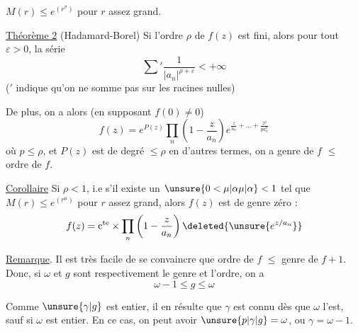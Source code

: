   $M(r)\leq e^{(r^\sigma)}$ pour $r$ assez grand.

\uline{Théorème 2} (Hadamard-Borel) Si l'ordre $\rho$ de $f(z)$
est fini, alors pour tout $\varepsilon>0$, la série
\[ \sum{}'\frac{1}{|a_n|^{\rho+\varepsilon}}<+\infty \tag*{(5)} \]
($'$ indique
qu'on ne somme pas sur les racines nulles)

De plus, on a alors (en supposant $f(0)\ne0$)
\[ f(z)=e^{P(z)}\prod_n\left(1-\frac{z}{a_n}\right)e^{\frac{z}{a_n}+\ldots+\frac{z^p}{p a_n^p}} \]
où $p\leq\rho$, et $P(z)$ est  
de degré $\leq\rho$  en d'autres termes, on
a \qquad genre de $f$ $\leq$ ordre de $f$.

\uline{Corollaire} \quad Si $\rho<1$, i.e s'il existe un $\unsure{0<\mu|\alpha\mu|\alpha}<1$
tel que $M(r)\leq e^{(r^\mu)}$ pour $r$ assez grand,
alors $f(z)$ est de genre zéro :
\[ f(z)=\mathrm c^{\mathrm{te}}\mathbin{\times}\prod_n\left(1-\frac{z}{a_n}\right)\deleted{\unsure{e^{z/a_n}}} \]

\uline{Remarque}. \quad Il est très facile de se convaincre
que \qquad ordre de $f$ $\leq$ genre de $f+1$. Donc, si $\omega$ et
$g$ sont respectivement le genre et l'ordre, on a
\[ \boxed{\omega-1\leq g\leq\omega} \]

Comme $\unsure{\gamma|g}$ est entier, il en résulte que $\gamma$
est connu dès que $\omega$ l'est, sauf si $\omega$ est
entier. En ce cas, on peut avoir $\unsure{p|\gamma|g}=\omega$, ou
$\gamma=\omega-1$.
